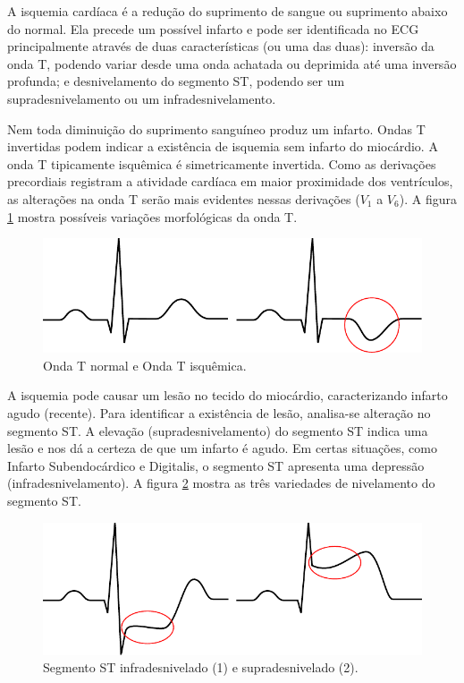 A isquemia cardíaca é a redução do suprimento de sangue ou suprimento abaixo do normal. Ela precede um possível infarto e pode ser identificada no ECG principalmente através de duas características (ou uma das duas): inversão da onda T, podendo variar desde uma onda achatada ou deprimida até uma inversão profunda; e desnivelamento do segmento ST, podendo ser um supradesnivelamento ou um infradesnivelamento.

Nem toda diminuição do suprimento sanguíneo produz um infarto. Ondas T invertidas podem indicar a existência de isquemia sem infarto do miocárdio.  A onda T tipicamente isquêmica é simetricamente invertida. Como as derivações precordiais registram a atividade cardíaca em maior proximidade dos ventrículos, as alterações na onda T serão mais evidentes nessas derivações ($V_1$ a $V_6$). A figura \ref{fig:twave} mostra possíveis variações morfológicas da onda T.

\begin{figure}[ht!]
 \centering
 \includegraphics[width=400pt]{figures/chap2-t-waves.pdf}
 \caption[Onda T normal e Onda T isquêmica]{Onda T normal e Onda T isquêmica.}
 \label{fig:twave}
\end{figure}

A isquemia pode causar um lesão no tecido do miocárdio, caracterizando infarto agudo (recente). Para identificar a existência de lesão, analisa-se alteração no segmento ST. A elevação (supradesnivelamento) do segmento ST indica uma lesão e nos dá a certeza de que um infarto é agudo. Em certas situações, como Infarto Subendocárdico e Digitalis, o segmento ST apresenta uma depressão (infradesnivelamento). A figura \ref{fig:stdev} mostra as três variedades de nivelamento do segmento ST.

\begin{figure}[ht!]
 \centering
 \includegraphics[width=400pt]{figures/chap2-st-segments.pdf}
 \caption[Segmento ST infradesnivelado e supradesnivelado]{Segmento ST infradesnivelado (1) e supradesnivelado (2).}
 \label{fig:stdev}
\end{figure}


